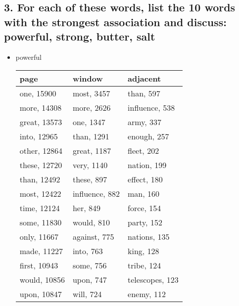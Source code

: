 \documentclass[12pt,letterpaper]{article}
\begin{document}
\subsection*{3. For each of these words, list the 10 words with the strongest association and discuss: powerful, strong, butter, salt}
\begin{itemize}

\item powerful
\\
\begin{tabular}{| p{5cm} | p{5cm} | p{5cm} |}
    \hline 
    page & window & adjacent \\ \hline
    one, 15900 & most, 3457 & than, 597 \\
    more, 14308 & more, 2626 & influence, 538 \\
    great, 13573 & one, 1347 & army, 337 \\
    into, 12965 & than, 1291 & enough, 257 \\
    other, 12864 & great, 1187 & fleet, 202 \\
    these, 12720 & very, 1140 & nation, 199 \\
    than, 12492 & these, 897 & effect, 180 \\
    most, 12422 & influence, 882 & man, 160 \\
    time, 12124 & her, 849 & force, 154 \\
    some, 11830 & would, 810 & party, 152 \\
    only, 11667 & against, 775 & nations, 135 \\
    made, 11227 & into, 763 & king, 128 \\
    first, 10943 & some, 756 & tribe, 124 \\
    would, 10856 & upon, 747 & telescopes, 123 \\
    upon, 10847 & will, 724 & enemy, 112 \\
    \hline
\end{tabular}


\end{itemize}
\end{document}
